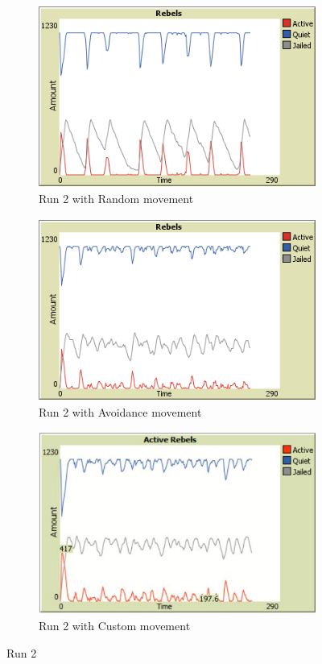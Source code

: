 \documentclass[a4paper,11pt]{article}
\begin{document}
\begin{figure}[h]
 \begin{subfigure}{0.33\textwidth}
  \includegraphics[width=\linewidth, height=6cm]{plotRun2Random.png} 
  \caption{Run 2 with Random movement}
  \label{fig:subimrun2Rand}
 \end{subfigure}
 \begin{subfigure}{0.33\textwidth}
  \includegraphics[width=\linewidth, height=6cm]{plotRun2Avoidance.png}
  \caption{Run 2 with Avoidance movement}
  \label{fig:subimrun2Avoid}
 \end{subfigure}
 \begin{subfigure}{0.33\textwidth}
  \includegraphics[width=\linewidth, height=6cm]{Run2_Custom.JPG}
  \caption{Run 2 with Custom movement}
  \label{fig:subimrun2Custom}
 \end{subfigure}
\caption{Run 2}
\label{fig:figRun2}
\end{figure}
\end{document}
